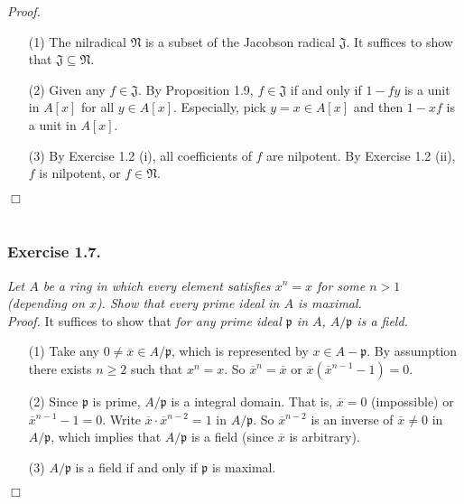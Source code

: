 \documentclass{article}
\begin{document}
\emph{Proof.}
\begin{enumerate}
\item[(1)]
  The nilradical $\mathfrak{N}$ is a subset of the Jacobson radical $\mathfrak{J}$.
  It suffices to show that $\mathfrak{J} \subseteq \mathfrak{N}$.

\item[(2)]
  Given any $f \in \mathfrak{J}$. By Proposition 1.9,
  $f \in \mathfrak{J}$ if and only if
  $1 - fy$ is a unit in $A[x]$ for all $y \in A[x]$.
  Especially, pick $y = x \in A[x]$ and then $1 - xf$ is a unit in $A[x]$.

\item[(3)]
  By Exercise 1.2 (i), all coefficients of $f$ are nilpotent.
  By Exercise 1.2 (ii), $f$ is nilpotent, or $f \in \mathfrak{N}$.
\end{enumerate}
$\Box$ \\\\






\subsubsection*{Exercise 1.7.}
\emph{Let $A$ be a ring in which every element satisfies
$x^n = x$ for some $n > 1$ (depending on $x$).
Show that every prime ideal in $A$ is maximal.} \\



\emph{Proof.}
It suffices to show that
\emph{for any prime ideal $\mathfrak{p}$ in $A$, $A/\mathfrak{p}$ is a field.}
\begin{enumerate}
\item[(1)]
  Take any $0 \neq \overline{x} \in A/\mathfrak{p}$,
  which is represented by $x \in A-\mathfrak{p}$.
  By assumption there exists $n \geq 2$ such that $x^n = x$.
  So $\overline{x}^n = \overline{x}$ or $\overline{x}(\overline{x}^{n-1} - 1) = 0$.

\item[(2)]
  Since $\mathfrak{p}$ is prime, $A/\mathfrak{p}$ is a integral domain.
  That is, $\overline{x} = 0$ (impossible) or $\overline{x}^{n-1} - 1 = 0$.
  Write $\overline{x} \cdot \overline{x}^{n-2} = 1$ in $A/\mathfrak{p}$.
  So $\overline{x}^{n-2}$ is an inverse of $\overline{x} \neq 0$ in $A/\mathfrak{p}$,
  which implies that $A/\mathfrak{p}$ is a field (since $\overline{x}$ is arbitrary).

\item[(3)]
  $A/\mathfrak{p}$ is a field if and only if $\mathfrak{p}$ is maximal.
\end{enumerate}
$\Box$ \\\\
\end{document}
